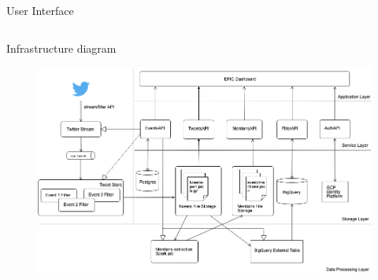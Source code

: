 \documentclass[final]{beamer}
\newlength{\onecolwid}
\newlength{\twocolwid}
\begin{document}
\begin{darkframes}
\begin{frame}
\begin{columns}[t]
\begin{column}{\twocolwid}
\begin{columns}[t,totalwidth=\twocolwid]
\begin{column}{\onecolwid}
\begin{exampleblock}{User Interface}
\end{exampleblock}


\end{column} %

\end{columns} %


\begin{alertblock}{Infrastructure diagram}
\begin{figure}
\includegraphics[width=1\twocolwid]{img/infra_white.png}
\end{figure}

\end{alertblock} 


\begin{columns}[t,totalwidth=\twocolwid] %

\begin{column}{\onecolwid} %





\end{column}
\end{columns}
\end{column}
\end{columns}
\end{frame}
\end{darkframes}
\end{document}
